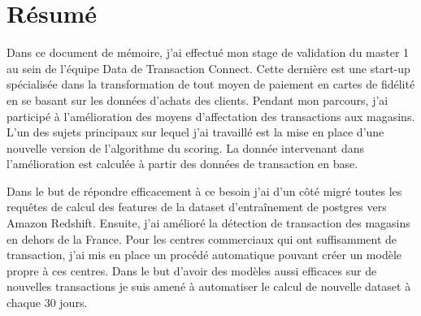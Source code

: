 \chapter*{Résumé}
 
Dans ce document de mémoire, j’ai effectué mon stage de validation du master 1 au sein de l’équipe Data de Transaction Connect. Cette dernière est une start-up spécialisée dans la transformation de tout moyen de paiement en cartes de fidélité en se basant sur les données d’achats des clients. Pendant mon parcours, j’ai participé à l’amélioration des  moyens d’affectation des transactions aux magasins. L’un des sujets principaux sur lequel j’ai travaillé est la mise en place d’une nouvelle version de l’algorithme du scoring. La donnée intervenant dans l'amélioration est calculée à partir des données de transaction en base. 

Dans le but de répondre efficacement à ce besoin j’ai d’un côté migré toutes les requêtes de calcul des features de la dataset d'entraînement de postgres vers Amazon Redshift. Ensuite, j’ai amélioré la détection de transaction des magasins en dehors de la France. Pour les centres commerciaux qui ont suffisamment de transaction, j’ai mis en place un procédé automatique pouvant créer un modèle propre à ces centres. Dans le but d’avoir des modèles aussi efficaces sur de nouvelles transactions je suis amené à automatiser le calcul de nouvelle dataset à chaque 30 jours. 




